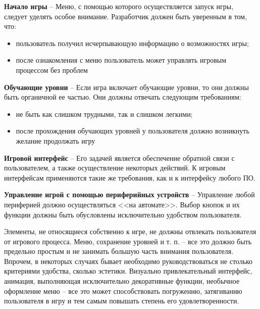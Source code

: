 \documentclass{article}
\begin{document}
\textbf{Начало игры} -- Меню, с помощью которого осуществляется запуск игры, следует уделять особое внимание. Разработчик должен быть уверенным в том, что:
\begin{itemize}
  \item пользователь получил исчерпывающую информацию о возможностях игры;
  \item после ознакомления с меню пользователь может управлять игровым процессом без проблем
\end{itemize}

\textbf{Обучающие уровни} -- Если игра включает обучающие уровни, то они должны быть органичной ее частью. Они должны отвечать следующим требованиям:
\begin{itemize}
  \item не быть как слишком трудными, так и слишком легкими;
  \item после прохождения обучающих уровней у пользователя должно возникнуть желание продолжать игру
\end{itemize}

\textbf{Игровой интерфейс} -- Его задачей является обеспечение обратной связи с пользователем, а также осуществление некоторых действий. К игровым интерфейсам применяются такие же требования, как и к интерфейсу любого ПО.

\textbf{Управление игрой с помощью периферийных устройств} -- Управление любой периферией должно осуществляться <<на автомате>>. Выбор кнопок и их функции должны быть обусловлены исключительно удобством пользователя.

\bigskip

Элементы, не относящиеся собственно к игре, не должны отвлекать пользователя от игрового процесса. Меню, сохранение уровней и т. п. -- все это должно быть предельно простым и не занимать большую часть внимания пользователя. Впрочем, в некоторых случаях бывает необходимо руководствоваться не столько критериями удобства, сколько эстетики. Визуально привлекательный интерфейс, анимация, выполняющая исключительно декоративные функции, необычное оформление меню -- все это может способствовать погружению, затягиванию пользователя в игру и тем самым повышать степень его удовлетворенности.

\bigskip
\end{document}
